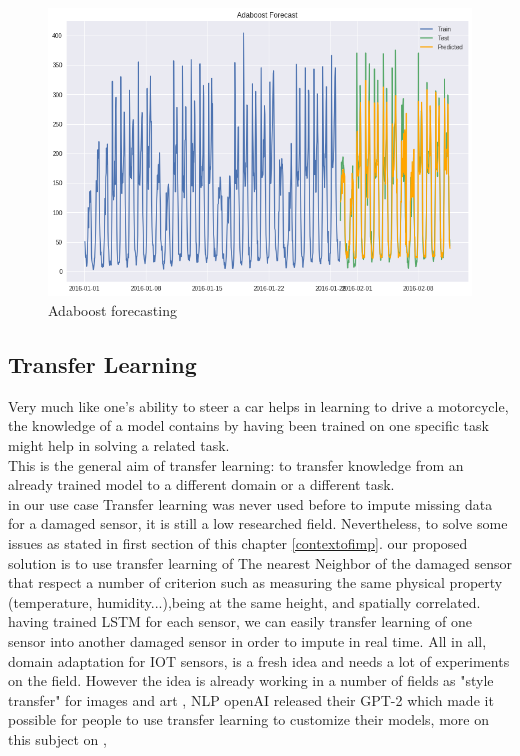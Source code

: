 \begin{figure}[!h]
\centering
\includegraphics[scale=.6]{img/adaboost_results.png}  
\caption{Adaboost forecasting}
\label{fig:adaboost}
\end{figure}


\subsection{Transfer Learning}
Very much like one's ability to steer a car helps in learning to drive a motorcycle, the knowledge of a model contains by having been trained on one specific task might help in solving a related task.\\This is the general aim of transfer learning: to transfer knowledge from an already trained model to a different domain or a different task.\\ in our use case Transfer learning was never used before to impute missing data for a damaged sensor, it is still a low researched field. Nevertheless, to solve some issues as stated in first section of this chapter \ref{contextofimp}. our proposed solution is to use transfer learning of The nearest Neighbor of the damaged sensor that respect a number of  criterion  such as measuring the same physical property (temperature, humidity...),being at the same height, and spatially correlated. having trained LSTM for each sensor, we can easily transfer learning of one sensor into another damaged sensor in order to impute in real time. All in all, domain adaptation for IOT sensors, is a fresh idea and needs a lot of experiments on the field. However the idea is already working in a number of fields as "style transfer" for images and art \cite{transferlearning}, NLP openAI released their GPT-2 which made it possible for people to use transfer learning to customize their models, more on this subject on \cite{nlp},   



